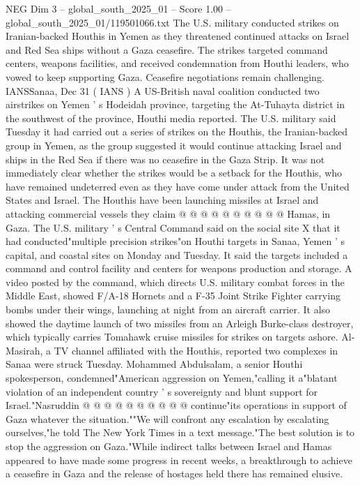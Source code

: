 \begin{textsample}{NEG Dim 3 – global\_south\_2025\_01 – Score 1.00 – global\_south\_2025\_01/119501066.txt}  \label{ex:f3_neg_074}
The U.S. military conducted strikes on Iranian-backed Houthis in Yemen as they threatened continued attacks on Israel and Red Sea ships without a Gaza ceasefire.
The strikes targeted command centers, weapons facilities, and received condemnation from Houthi leaders, who vowed to keep supporting Gaza.
Ceasefire negotiations remain challenging.
IANSSanaa, Dec 31 ( IANS ) A US-British naval coalition conducted two airstrikes on Yemen ' s Hodeidah province, targeting the At-Tuhayta district in the southwest of the province, Houthi media reported.
The U.S. military said Tuesday it had carried out a series of strikes on the Houthis, the Iranian-backed group in Yemen, as the group suggested it would continue attacking Israel and ships in the Red Sea if there was no ceasefire in the Gaza Strip.
It was not immediately clear whether the strikes would be a setback for the Houthis, who have remained undeterred even as they have come under attack from the United States and Israel.
The Houthis have been launching missiles at Israel and attacking commercial vessels they claim @ @ @ @ @ @ @ @ @ @ Hamas, in Gaza.
The U.S. military ' s Central Command said on the social site X that it had conducted"multiple precision strikes"on Houthi targets in Sanaa, Yemen ' s capital, and coastal sites on Monday and Tuesday.
It said the targets included a command and control facility and centers for weapons production and storage.
A video posted by the command, which directs U.S. military combat forces in the Middle East, showed F/A-18 Hornets and a F-35 Joint Strike Fighter carrying bombs under their wings, launching at night from an aircraft carrier.
It also showed the daytime launch of two missiles from an Arleigh Burke-class destroyer, which typically carries Tomahawk cruise missiles for strikes on targets ashore.
Al-Masirah, a TV channel affiliated with the Houthis, reported two complexes in Sanaa were struck Tuesday.
Mohammed Abdulsalam, a senior Houthi spokesperson, condemned"American aggression on Yemen,"calling it a"blatant violation of an independent country ' s sovereignty and blunt support for Israel."Nasruddin @ @ @ @ @ @ @ @ @ @ continue"its operations in support of Gaza whatever the situation.""We will confront any escalation by escalating ourselves,"he told The New York Times in a text message."The best solution is to stop the aggression on Gaza."While indirect talks between Israel and Hamas appeared to have made some progress in recent weeks, a breakthrough to achieve a ceasefire in Gaza and the release of hostages held there has remained elusive.

\end{textsample}

